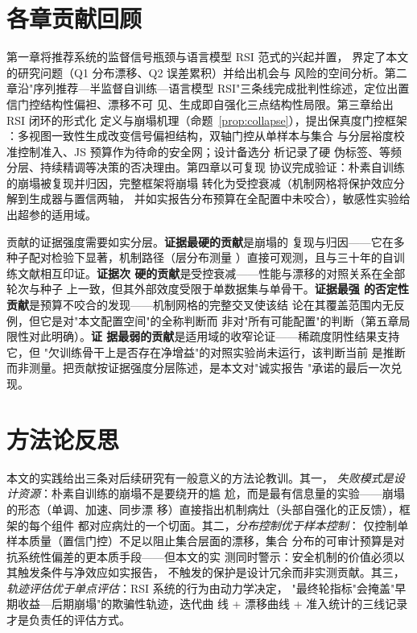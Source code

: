 \section{各章贡献回顾}
第一章将推荐系统的监督信号瓶颈与语言模型 RSI 范式的兴起并置，
界定了本文的研究问题（Q1 分布漂移、Q2 误差累积）并给出机会与
风险的空间分析。第二章沿"序列推荐—半监督自训练—语言模型
RSI"三条线完成批判性综述，定位出置信门控结构性偏袒、漂移不可
见、生成即自强化三点结构性局限。第三章给出 RSI 闭环的形式化
定义与崩塌机理（命题~\ref{prop:collapse}），提出保真度门控框架
：多视图一致性生成改变信号偏袒结构，双轴门控从单样本与集合
与分层裕度校准控制准入、JS 预算作为待命的安全网；设计备选分
析记录了硬
伪标签、等频分层、持续精调等决策的否决理由。第四章以可复现
协议完成验证：朴素自训练的崩塌被复现并归因，完整框架将崩塌
转化为受控衰减（机制网格将保护效应分解到生成器与置信两轴，
并如实报告分布预算在全配置中未咬合），敏感性实验给
出超参的适用域。

贡献的证据强度需要如实分层。\textbf{证据最硬的贡献}是崩塌的
复现与归因——它在多种子配对检验下显著，机制路径（层分布测量
）直接可观测，且与三十年的自训练文献相互印证。\textbf{证据次
硬的贡献}是受控衰减——性能与漂移的对照关系在全部轮次与种子
上一致，但其外部效度受限于单数据集与单骨干。\textbf{证据最强
的否定性贡献}是预算不咬合的发现——机制网格的完整交叉使该结
论在其覆盖范围内无反例，但它是对"本文配置空间"的全称判断而
非对"所有可能配置"的判断（第五章局限性对此明确）。\textbf{证
据最弱的贡献}是适用域的收窄论证——稀疏度阴性结果支持它，但
"欠训练骨干上是否存在净增益"的对照实验尚未运行，该判断当前
是推断而非测量。把贡献按证据强度分层陈述，是本文对"诚实报告
"承诺的最后一次兑现。

\section{方法论反思}
本文的实践给出三条对后续研究有一般意义的方法论教训。其一，
\emph{失败模式是设计资源}：朴素自训练的崩塌不是要绕开的尴
尬，而是最有信息量的实验——崩塌的形态（单调、加速、同步漂
移）直接指出机制病灶（头部自强化的正反馈），框架的每个组件
都对应病灶的一个切面。其二，\emph{分布控制优于样本控制}：
仅控制单样本质量（置信门控）不足以阻止集合层面的漂移，集合
分布的可审计预算是对抗系统性偏差的更本质手段——但本文的实
测同时警示：安全机制的价值必须以其触发条件与净效应如实报告，
不触发的保护是设计冗余而非实测贡献。其三，
\emph{轨迹评估优于单点评估}：RSI 系统的行为由动力学决定，
"最终轮指标"会掩盖"早期收益—后期崩塌"的欺骗性轨迹，迭代曲
线 + 漂移曲线 + 准入统计的三线记录才是负责任的评估方式。

